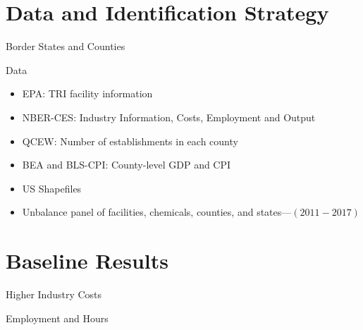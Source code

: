 \documentclass[aspectratio = 169]{beamer}
\begin{document}
    \section{Data and Identification Strategy}\label{sec:data-and-identification-strategy}
    \begin{frame}{Border States and Counties}
        
        \hypertarget{Border States}{}
        \hyperlink{fig:border-state-map}{}
        \hypertarget{Border Counties}{}
        \hyperlink{fig:border-county-map}{}
    \end{frame}

    \begin{frame}{Data}
        \begin{itemize}
            \item EPA: TRI facility information
            \item NBER-CES: Industry Information, Costs, Employment and Output
            \item QCEW: Number of establishments in each county
            \item BEA and BLS-CPI: County-level GDP and CPI
            \item US Shapefiles
            \item Unbalance panel of facilities, chemicals, counties, and states---$(2011-2017)$
        \end{itemize}
        \hypertarget{Summary Table}{}
        \hyperlink{tab:summary-table}{}
        \hypertarget{Balance Test Counties}{}
        \hyperlink{tab:balance-test-counties}{}
        \hypertarget{Balance Test States}{}
        \hyperlink{tab:balance-test-states}{}
    \end{frame}


    \section{Baseline Results}\label{sec:baseline-results}
    \begin{frame}[shrink = 30]{Higher Industry Costs}
        
        \hypertarget{Industry Costs}{}
        \hyperlink{tab:baseline-costs}{}
    \end{frame}

    \begin{frame}[shrink = 30]{Employment and Hours}
        
        \hypertarget{Employment and Hours}{}
        \hyperlink{tab:baseline-employment-hours}{}
        \hypertarget{Cross-County Worker Mobility}{}
        \hyperlink{tab:baseline-worker-mobility}{}
    \end{frame}
\end{document}
